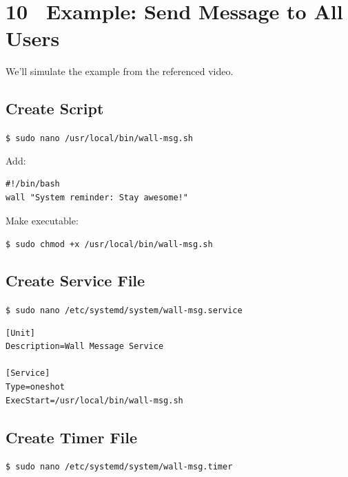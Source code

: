 \documentclass[12pt]{article}
\begin{document}
\section*{10 \faEnvelope\ Example: Send Message to All Users}

We'll simulate the example from the referenced video.

\subsection*{Create Script}

\begin{highlightbox}
\texttt{\$ sudo nano /usr/local/bin/wall-msg.sh}
\end{highlightbox}

Add:

\begin{highlightbox}
\begin{verbatim}
#!/bin/bash
wall "System reminder: Stay awesome!"
\end{verbatim}
\end{highlightbox}

Make executable:

\begin{highlightbox}
\texttt{\$ sudo chmod +x /usr/local/bin/wall-msg.sh}
\end{highlightbox}

\subsection*{Create Service File}

\begin{highlightbox}
\texttt{\$ sudo nano /etc/systemd/system/wall-msg.service}
\end{highlightbox}

\begin{highlightbox}
\begin{verbatim}
[Unit]
Description=Wall Message Service

[Service]
Type=oneshot
ExecStart=/usr/local/bin/wall-msg.sh
\end{verbatim}
\end{highlightbox}

\subsection*{Create Timer File}

\begin{highlightbox}
\texttt{\$ sudo nano /etc/systemd/system/wall-msg.timer}
\end{highlightbox}
\end{document}
